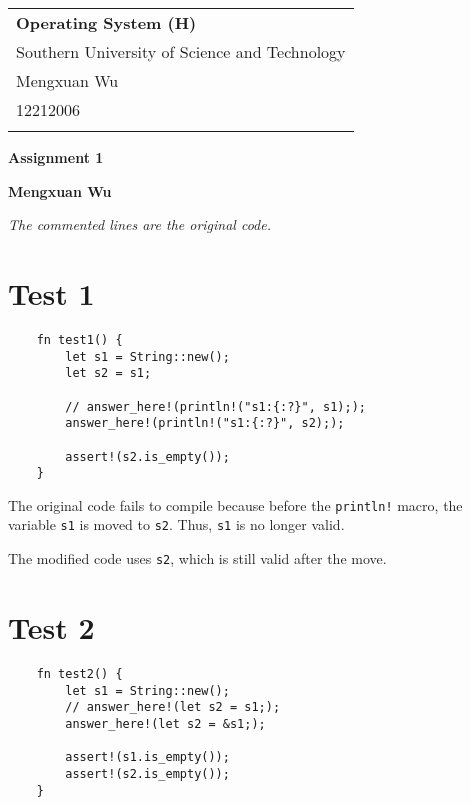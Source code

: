 \documentclass[a4paper,12pt]{article}
\begin{document}
\thispagestyle{empty} %

\begin{tabular}{p{15.5cm}}
{\large \bf Operating System (H)} \\
Southern University of Science and Technology \\ Mengxuan Wu \\ 12212006 \\
\hline
\\
\end{tabular}

\vspace*{0.3cm} %

\begin{center}
	{\Large \bf Assignment 1}
	\vspace{2mm}

	{\bf Mengxuan Wu}
		
\end{center}  

\vspace{0.4cm}

\textit{The commented lines are the original code.}

\section*{Test 1}

\begin{verbatim}
    fn test1() {
        let s1 = String::new();
        let s2 = s1;
    
        // answer_here!(println!("s1:{:?}", s1););
        answer_here!(println!("s1:{:?}", s2););
    
        assert!(s2.is_empty());
    }
\end{verbatim}

The original code fails to compile because before the \texttt{println!} macro, the variable \texttt{s1} is moved to \texttt{s2}. Thus, \texttt{s1} is no longer valid. 

The modified code uses \texttt{s2}, which is still valid after the move. 

\section*{Test 2}

\begin{verbatim}
    fn test2() {
        let s1 = String::new();
        // answer_here!(let s2 = s1;);
        answer_here!(let s2 = &s1;);

        assert!(s1.is_empty());
        assert!(s2.is_empty());
    }
\end{verbatim}
\end{document}
